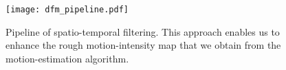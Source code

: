 \begin{figure}[!h]
	\begin{minipage}[b]{1.0\linewidth}
		\centering
		\centerline{ \texttt{[image: dfm\_pipeline.pdf]} }
	\end{minipage}
    \caption{Pipeline of spatio-temporal filtering. This approach enables us to enhance the rough
        motion-intensity map that we obtain from the motion-estimation algorithm.}
	\label{fig:dfm}
\end{figure}
